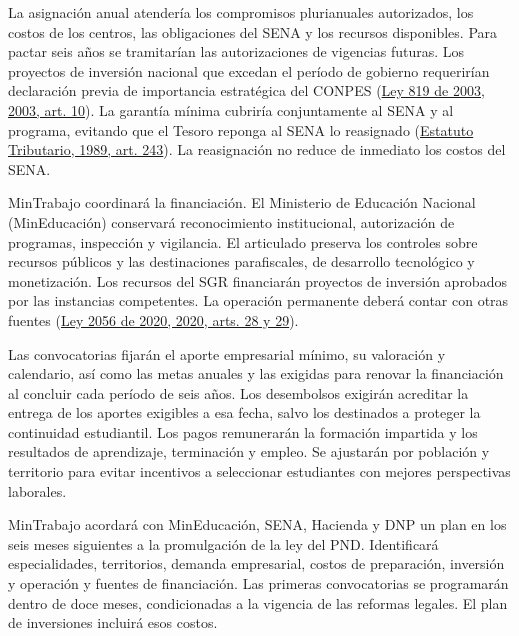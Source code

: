 La asignación anual atendería los compromisos plurianuales autorizados, los costos de los centros, las obligaciones del SENA y los recursos disponibles. Para pactar seis años se tramitarían las autorizaciones de vigencias futuras. Los proyectos de inversión nacional que excedan el período de gobierno requerirían declaración previa de importancia estratégica del CONPES (\hyperref[ref:bib:ley819]{Ley 819 de 2003, 2003, art. 10}). La garantía mínima cubriría conjuntamente al SENA y al programa, evitando que el Tesoro reponga al SENA lo reasignado (\href{https://normograma.sena.edu.co/compilacion/docs/estatuto_tributario_pr010.htm}{Estatuto Tributario, 1989, art. 243}). La reasignación no reduce de inmediato los costos del SENA.

MinTrabajo coordinará la financiación. El Ministerio de Educación Nacional (MinEducación) conservará reconocimiento institucional, autorización de programas, inspección y vigilancia. El articulado preserva los controles sobre recursos públicos y las destinaciones parafiscales, de desarrollo tecnológico y monetización. Los recursos del SGR financiarán proyectos de inversión aprobados por las instancias competentes. La operación permanente deberá contar con otras fuentes (\hyperref[ref:bib:ley2056]{Ley 2056 de 2020, 2020, arts. 28 y 29}).

Las convocatorias fijarán el aporte empresarial mínimo, su valoración y calendario, así como las metas anuales y las exigidas para renovar la financiación al concluir cada período de seis años. Los desembolsos exigirán acreditar la entrega de los aportes exigibles a esa fecha, salvo los destinados a proteger la continuidad estudiantil. Los pagos remunerarán la formación impartida y los resultados de aprendizaje, terminación y empleo. Se ajustarán por población y territorio para evitar incentivos a seleccionar estudiantes con mejores perspectivas laborales.

MinTrabajo acordará con MinEducación, SENA, Hacienda y DNP un plan en los seis meses siguientes a la promulgación de la ley del PND. Identificará especialidades, territorios, demanda empresarial, costos de preparación, inversión y operación y fuentes de financiación. Las primeras convocatorias se programarán dentro de doce meses, condicionadas a la vigencia de las reformas legales. El plan de inversiones incluirá esos costos.

